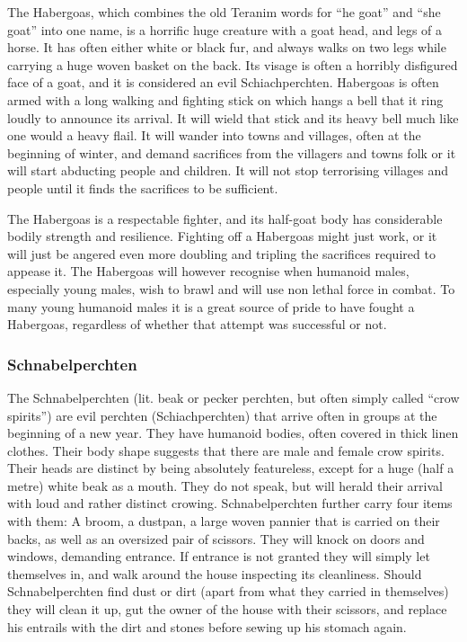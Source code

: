 The Habergoas, which combines the old Teranim words for ``he goat'' and ``she
goat'' into one name, is a horrific huge creature with a goat head, and legs
of a horse. It has often either white or black fur, and always walks on two
legs while carrying a huge woven basket on the back. Its visage is often a
horribly disfigured face of a goat, and it is considered an evil
Schiachperchten. Habergoas is often armed with a long walking and fighting
stick on which hangs a bell that it ring loudly to announce its arrival. It
will wield that stick and its heavy bell much like one would a heavy flail. It
will wander into towns and villages, often at the beginning of winter, and
demand sacrifices from the villagers and towns folk or it will start abducting
people and children. It will not stop terrorising villages and people until it
finds the sacrifices to be sufficient.

The Habergoas is a respectable fighter, and its half-goat body has
considerable bodily strength and resilience. Fighting off a Habergoas might
just work, or it will just be angered even more doubling and tripling the
sacrifices required to appease it. The Habergoas will however recognise when
humanoid males, especially young males, wish to brawl and will use non lethal
force in combat. To many young humanoid males it is a great source of pride
to have fought a Habergoas, regardless of whether that attempt was successful
or not.

\subsubsection{Schnabelperchten}
\label{sec:Schnabelperchten}

The Schnabelperchten (lit. beak or pecker perchten, but often simply called
``crow spirits'') are evil perchten (Schiachperchten) that arrive often in
groups at the beginning of a new year. They have humanoid bodies, often
covered in thick linen clothes. Their body shape suggests that there are male
and female crow spirits. Their heads are distinct by being absolutely
featureless, except for a huge (half a metre) white beak as a mouth. They do
not speak, but will herald their arrival with loud and rather distinct
crowing. Schnabelperchten further carry four items with them: A broom, a
dustpan, a large woven pannier that is carried on their backs, as well as an
oversized pair of scissors. They will knock on doors and windows, demanding
entrance. If entrance is not granted they will simply let themselves in, and
walk around the house inspecting its cleanliness. Should Schnabelperchten find
dust or dirt (apart from what they carried in themselves) they will clean it
up, gut the owner of the house with their scissors, and replace his entrails
with the dirt and stones before sewing up his stomach again.

